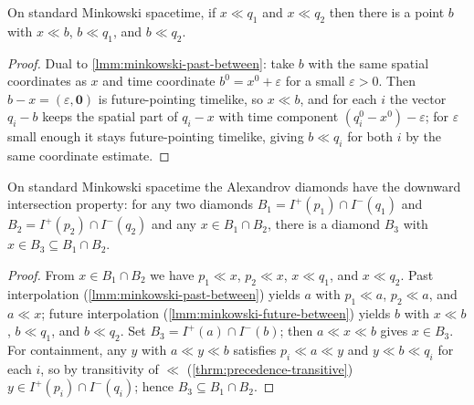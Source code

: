 \medskip

\begin{lemma}
    \label{lmm:minkowski-future-between}
    \leanok
    On standard Minkowski spacetime, if $x \ll q_1$ and $x \ll q_2$ then there is a point $b$ with $x \ll b$, $b \ll q_1$, and $b \ll q_2$.
\end{lemma}
\begin{proof}
    \leanok
    Dual to \ref{lmm:minkowski-past-between}: take $b$ with the same spatial coordinates as $x$ and time coordinate $b^0 = x^0 + \varepsilon$ for a small $\varepsilon > 0$. Then $b - x = (\varepsilon, \mathbf{0})$ is future-pointing timelike, so $x \ll b$, and for each $i$ the vector $q_i - b$ keeps the spatial part of $q_i - x$ with time component $(q_i^0 - x^0) - \varepsilon$; for $\varepsilon$ small enough it stays future-pointing timelike, giving $b \ll q_i$ for both $i$ by the same coordinate estimate.
\end{proof}

\medskip

\begin{lemma}
    \label{lmm:minkowski-diamonds-downward-directed}
    \leanok
    On standard Minkowski spacetime the Alexandrov diamonds have the downward intersection property: for any two diamonds $B_1 = I^+(p_1) \cap I^-(q_1)$ and $B_2 = I^+(p_2) \cap I^-(q_2)$ and any $x \in B_1 \cap B_2$, there is a diamond $B_3$ with $x \in B_3 \subseteq B_1 \cap B_2$.
\end{lemma}
\begin{proof}
    \leanok
    From $x \in B_1 \cap B_2$ we have $p_1 \ll x$, $p_2 \ll x$, $x \ll q_1$, and $x \ll q_2$. Past interpolation (\ref{lmm:minkowski-past-between}) yields $a$ with $p_1 \ll a$, $p_2 \ll a$, and $a \ll x$; future interpolation (\ref{lmm:minkowski-future-between}) yields $b$ with $x \ll b$, $b \ll q_1$, and $b \ll q_2$. Set $B_3 = I^+(a) \cap I^-(b)$; then $a \ll x \ll b$ gives $x \in B_3$. For containment, any $y$ with $a \ll y \ll b$ satisfies $p_i \ll a \ll y$ and $y \ll b \ll q_i$ for each $i$, so by transitivity of $\ll$ (\ref{thrm:precedence-transitive}) $y \in I^+(p_i) \cap I^-(q_i)$; hence $B_3 \subseteq B_1 \cap B_2$.
\end{proof}

